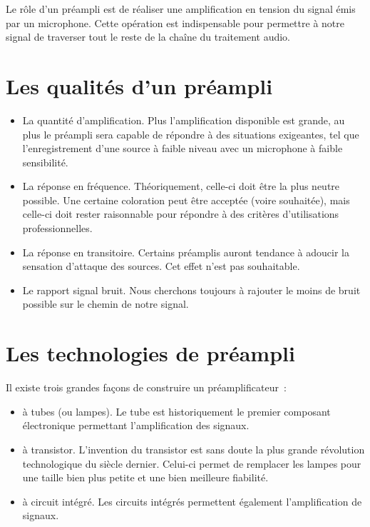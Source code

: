 \documentclass[
]{book}
\providecommand{\tightlist}{%
  \setlength{\itemsep}{0pt}\setlength{\parskip}{0pt}}
\begin{document}
Le rôle d'un préampli est de réaliser une amplification en tension du signal émis par un microphone. Cette opération est indispensable pour permettre à notre signal de traverser tout le reste de la chaîne du traitement audio.

\hypertarget{les-qualituxe9s-dun-pruxe9ampli}{%
\section{Les qualités d'un préampli}\label{les-qualituxe9s-dun-pruxe9ampli}}

\begin{itemize}
\tightlist
\item
  La quantité d'amplification. Plus l'amplification disponible est grande, au plus le préampli sera capable de répondre à des situations exigeantes, tel que l'enregistrement d'une source à faible niveau avec un microphone à faible sensibilité.
\item
  La réponse en fréquence. Théoriquement, celle-ci doit être la plus neutre possible. Une certaine coloration peut être acceptée (voire souhaitée), mais celle-ci doit rester raisonnable pour répondre à des critères d'utilisations professionnelles.
\item
  La réponse en transitoire. Certains préamplis auront tendance à adoucir la sensation d'attaque des sources. Cet effet n'est pas souhaitable.
\item
  Le rapport signal bruit. Nous cherchons toujours à rajouter le moins de bruit possible sur le chemin de notre signal.
\end{itemize}

\hypertarget{les-technologies-de-pruxe9ampli}{%
\section{Les technologies de préampli}\label{les-technologies-de-pruxe9ampli}}

Il existe trois grandes façons de construire un préamplificateur~:

\begin{itemize}
\tightlist
\item
  à tubes (ou lampes). Le tube est historiquement le premier composant électronique permettant l'amplification des signaux.
\item
  à transistor. L'invention du transistor est sans doute la plus grande révolution technologique du siècle dernier. Celui-ci permet de remplacer les lampes pour une taille bien plus petite et une bien meilleure fiabilité.
\item
  à circuit intégré. Les circuits intégrés permettent également l'amplification de signaux.
\end{itemize}
\end{document}
